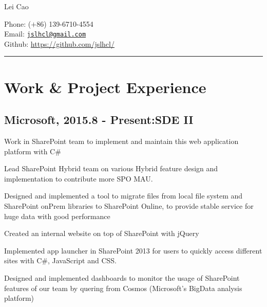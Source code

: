 \documentclass[letterpaper]{article}
\def\name{Lei Cao}
\renewenvironment{itemize}{
\begin{list}{*}{
    \setlength{\leftmargin}{1.5em}
    \setlength{\itemsep}{0pt}
  }
}{
  \end{list}
}
\begin{document}


\begin{minipage}{0.55\linewidth}
  {\huge \name}
\end{minipage}
\begin{minipage}{0.40\linewidth}
  Phone: ($+$86) 139-6710-4554 \\
  Email: \href{mailto:jslhcl@gmail.com}{\tt jslhcl@gmail.com} \\
  Github: \url{https://github.com/jslhcl/} 
\end{minipage}

\rule{16.8cm}{0.1em}

\vspace{-1em}
\section*{Work \& Project Experience}

\subsection*{\textbf{Microsoft, 2015.8 - Present:\hfill SDE II}}
Work in SharePoint team to implement and maintain this web application platform with C\#
\begin{itemize}
\item Lead SharePoint Hybrid team on various Hybrid feature design and implementation to contribute more SPO MAU.
\item Designed and implemented a tool to migrate files from local file system and SharePoint onPrem libraries to SharePoint Online, to provide stable service for huge data with good performance
\item Created an internal website on top of SharePoint with jQuery
\item Implemented app launcher in SharePoint 2013 for users to quickly access different sites with C\#, JavaScript and CSS.
\item Designed and implemented dashboards to monitor the usage of SharePoint features of our team by quering from Cosmos (Microsoft's BigData analysis platform)
\end{itemize}
%
\end{document}
